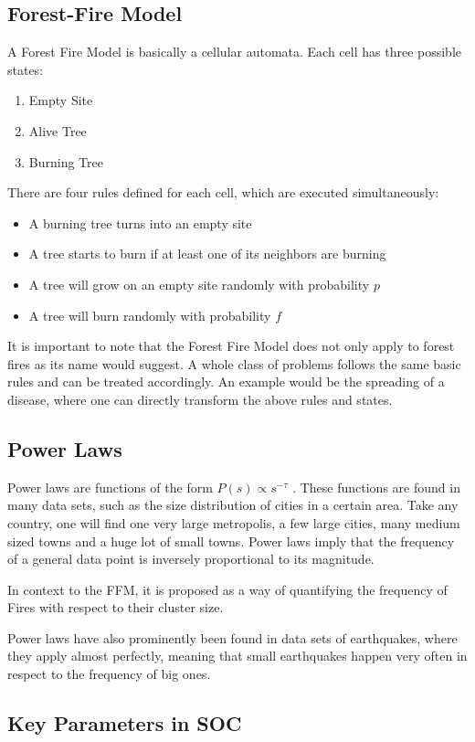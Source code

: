 \documentclass[11pt]{article}
\begin{document}
\subsection{Forest-Fire Model}
A Forest Fire Model is basically a cellular automata. Each cell has three possible states:
\begin{enumerate}
\item Empty Site
\item Alive Tree
\item Burning Tree
\end{enumerate}
There are four rules defined for each cell, which are executed simultaneously:
\begin {itemize}
\item A burning tree turns into an empty site
\item A tree starts to burn if at least one of its neighbors are burning
\item A tree will grow on an empty site randomly with probability $p$
\item A tree will burn randomly with probability $f$

\end{itemize}
It is important to note that the Forest Fire Model does not only apply to forest fires as its name would suggest. A whole class of problems follows the same basic rules and can be treated accordingly. An example would be the spreading of a disease, where one can directly transform the above rules and states.

\subsection{Power Laws}
Power laws are functions of the form $ P(s) \varpropto s^{-\tau}$ . These functions are found in many data sets, such as the size distribution of cities in a certain area. Take any country, one will find one very large metropolis, a few large cities, many medium sized towns and a huge lot of small towns. Power laws imply that the frequency of a general data point is inversely proportional to its magnitude. 

In context to the FFM, it is proposed as a way of quantifying the frequency of Fires with respect to their cluster size. 

Power laws have also prominently been found in data sets of earthquakes, where they apply almost perfectly, meaning that small earthquakes happen very often in respect to the frequency of big ones.

\subsection{Key Parameters in SOC}
\end{document}
